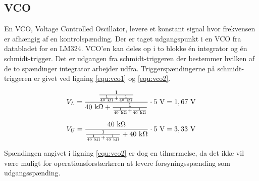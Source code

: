 \subsection{VCO}
\label{volumenkontrol-simulering-vco}

En VCO, Voltage Controlled Oscillator, levere et konstant signal hvor frekvensen er afhængig af en kontrolspænding. Der er taget udgangspunkt i en VCO fra databladet for en LM324. VCO'en kan deles op i to blokke én integrator og én schmidt-trigger. Det er udgangen fra schmidt-triggeren der bestemmer hvilken af de to spændinger integrator arbejder udfra. Triggerspændingerne på schmidt-triggeren er givet ved ligning \ref{equ:vco1} og \ref{equ:vco2}.

\begin{equation}
\label{equ:vco1}
V_L = \mathrm{\frac{\frac{1}{\frac{1}{40~k\ohm} + \frac{1}{40~k\ohm}}}{40~k\ohm + \frac{1}{\frac{1}{40~k\ohm} + \frac{1}{40~k\ohm}}} \cdot 5~V = 1,67~V}
\end{equation}

\begin{equation}
\label{equ:vco2}
V_U = \mathrm{\frac{40~k\ohm}{\frac{1}{\frac{1}{40~k\ohm} + \frac{1}{40~k\ohm}} + 40~k\ohm} \cdot 5~V = 3,33~V}
\end{equation}

Spændingen angivet i ligning \ref{equ:vco2} er dog en tilnærmelse, da det ikke vil være muligt for operationsforstærkeren at levere forsyningsspænding som udgangsspænding.